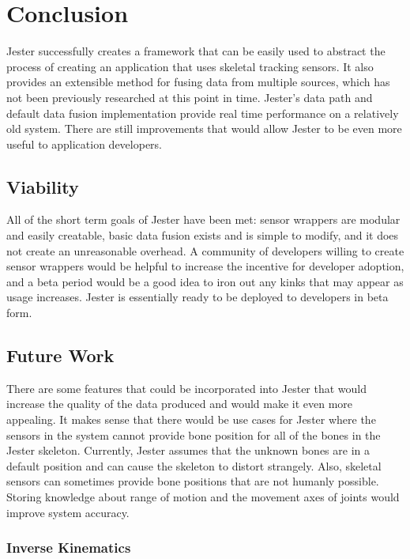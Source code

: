\chapter{Conclusion}

Jester successfully creates a framework that can be easily used to abstract the process of creating an application that uses skeletal tracking sensors. It also provides an extensible method for fusing data from multiple sources, which has not been previously researched at this point in time. Jester's data path and default data fusion implementation provide real time performance on a relatively old system. There are still improvements that would allow Jester to be even more useful to application developers.

\section{Viability}

All of the short term goals of Jester have been met: sensor wrappers are modular and easily creatable, basic data fusion exists and is simple to modify, and it does not create an unreasonable overhead. A community of developers willing to create sensor wrappers would be helpful to increase the incentive for developer adoption, and a beta period would be a good idea to iron out any kinks that may appear as usage increases. Jester is essentially ready to be deployed to developers in beta form.

\section{Future Work}

There are some features that could be incorporated into Jester that would increase the quality of the data produced and would make it even more appealing. It makes sense that there would be use cases for Jester where the sensors in the system cannot provide bone position for all of the bones in the Jester skeleton. Currently, Jester assumes that the unknown bones are in a default position and can cause the skeleton to distort strangely. Also, skeletal sensors can sometimes provide bone positions that are not humanly possible. Storing knowledge about range of motion and the movement axes of joints would improve system accuracy.

\subsection{Inverse Kinematics}

